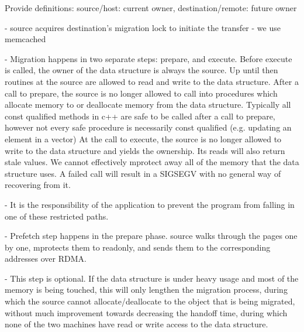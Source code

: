 Provide definitions: source/host: current owner, destination/remote: future owner

- source acquires destination's migration lock to initiate the transfer
    - we use memcached

- Migration happens in two separate steps: prepare, and execute. Before execute
  is called, the owner of the data structure is always the source. Up until then
  routines at the source are allowed to read and write to the data structure.
  After a call to prepare, the source is no longer allowed to call into
  procedures which allocate memory to or deallocate memory from the data structure. Typically all const qualified methods in c++ 
  are safe to be called after a call to prepare, however not every safe procedure is necessarily const qualified (e.g. updating an element in a vector)
  At the call to execute, the source is no longer allowed to write to the data structure and yields the ownership. Its reads will also return stale values.
  We cannot effectively mprotect away all of the memory that the data structure uses. A failed call will result in a SIGSEGV with no general way of
  recovering from it.

  - It is the responsibility of the application to prevent the program from falling in one of these restricted paths.



- Prefetch step happens in the prepare phase. source walks through the pages one by one, mprotects them to readonly, and
  sends them to the corresponding addresses over RDMA.

  - This step is optional. If the data structure is under heavy usage and most of the memory is being touched, this
  will only lengthen the migration process, during which the source cannot allocate/deallocate to the object that is being
  migrated, without much improvement towards decreasing the handoff time, during which
  none of the two machines have read or write access to the data structure.


